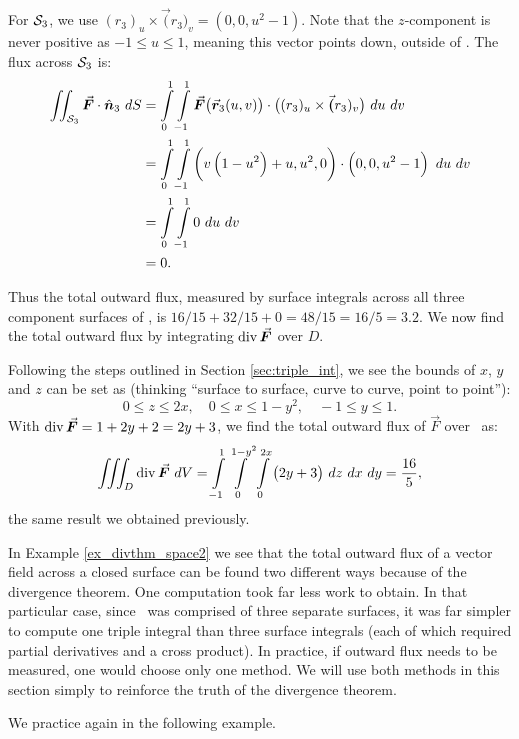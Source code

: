 \begin{example}
For $\mathcal{S}_3$, we use $(r_{3})_u\times\vec (r_{3})_v = \left( 0,0,u^2-1\right)$. Note that the $z$-component is never positive as  $-1\leq u\leq 1$, meaning this vector points down, outside of \surfaceS. The flux across $\mathcal{S}_3$ is:
\begin{align*}
\iint_{\surfaceS_3} \vec F\cdot \hat n_3\ dS 
		&= \int\limits_0^1\int\limits_{-1}^1 \vec F\big(\vec r_3(u,v)\big)\cdot \big((r_{3})_u\times\vec (r_{3})_v\big)\ du\ dv\\
		&= \int\limits_0^1\int\limits_{-1}^1 \left( v\left(1-u^2\right)+u,u^2,0\right) \cdot \left( 0,0,u^2-1\right)\ du\ dv\\
		&= \int\limits_0^1\int\limits_{-1}^1 0\ du\ dv\\
		&= 0.
\end{align*}

Thus the total outward flux, measured by surface integrals across all three component surfaces of \surfaceS, is $16/15+32/15+0 = 48/15 = 16/5 = 3.2$. We now find the total outward flux by integrating $\divv \vec F$ over $D$.

Following the steps outlined in Section \ref{sec:triple_int}, we see the bounds of $x$, $y$ and $z$ can be set as (thinking ``surface to surface, curve to curve, point to point''):
$$0\leq z\leq 2x,\quad 0\leq x\leq 1-y^2,\quad -1\leq y\leq 1.$$
With $\divv \vec F = 1+2y+2 = 2y+3$, we find the total outward flux of $\vec F$ over \surfaceS\ as:
$$\iiint_D\divv \vec F\ dV = \int\limits_{-1}^1\int\limits_0^{1-y^2}\int\limits_0^{2x}\big(2y+3\big)\ dz\ dx\ dy = \dfrac{16}{5},$$
the same result we obtained previously.
\end{example}

In Example \ref{ex_divthm_space2} we see that the total outward flux of a vector field across a closed surface can be found two different ways because of the divergence theorem. One computation took far less work to obtain. In that particular case, since \surfaceS\ was comprised of three separate surfaces, it was far simpler to compute one triple integral than three surface integrals (each of which required partial derivatives and a cross product). In practice, if outward flux needs to be measured, one would choose only one method. We will use both methods in this section simply to reinforce the truth of the divergence theorem.

We practice again in the following example.\\
\enlargethispage{2\baselineskip}

